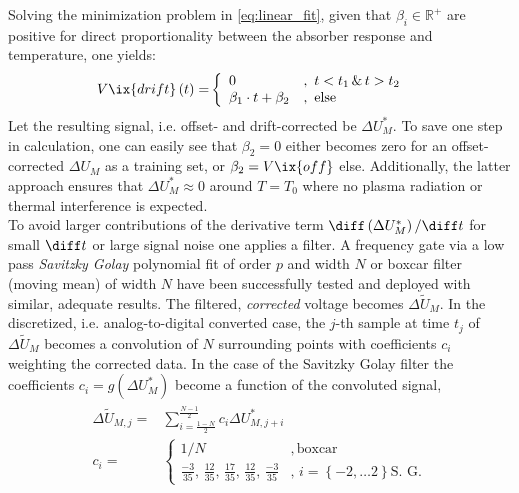%
                Solving the minimization problem in \cref{eq:linear_fit}, given that $\beta_{i}\in\mathbb{R}^{+}$ are positive for direct proportionality between the absorber response and temperature, one yields:%
%
                \begin{align}%
                    V\ix{drift}\left(t\right)=&\left\{%
                    \begin{array}{ll}%
                        0&,\,\,t<t_{1}\,\&\,t>t_{2}\\%
                        \beta_{1}\cdot t+\beta_{2}&,\,\,\text{else}%
                    \end{array}\right.\label{eq:drift}%
                \end{align}%
%
                Let the resulting signal, i.e. offset- and drift-corrected be $\Delta U^{*}_{M}$. To save one step in calculation, one can easily see that $\beta_{2}=0$ either becomes zero for an offset-corrected $\Delta U_{M}$ as a training set, or $\beta_{2}=V\ix{off}$ else. Additionally, the latter approach ensures that $\Delta U^{*}_{M}\approx0$ around $T=T_{0}$ where no plasma radiation or thermal interference is expected.\\%
                To avoid larger contributions of the derivative term $\diff\left(\Delta U^{*}_{M}\right)/\diff t$ for small $\diff t$ or large signal noise one applies a filter. A frequency gate via a low pass \textit{Savitzky Golay} polynomial fit of order $p$ and width $N$ or boxcar filter (moving mean) of width $N$ have been successfully tested and deployed with similar, adequate results. The filtered, \textit{corrected} voltage becomes $\Delta\widetilde{U}_{M}$. In the discretized, i.e. analog-to-digital converted  case, the $j$-th sample at time $t_{j}$ of $\Delta\widetilde{U}_{M}$ becomes a convolution of $N$ surrounding points with coefficients $c_{i}$ weighting the corrected data. In the case of the Savitzky Golay filter the coefficients $c_{i}=g\left(\Delta U_{M}^{*}\right)$ become a function of the convoluted signal, %
%
                \begin{align}%
                    \begin{split}%
                        \Delta\widetilde{U}_{M,j}=&\sum_{i=\frac{1-N}{2}}^{\frac{N-1}{2}}c_{i}\Delta U^{*}_{M, j+i}\\%
                        c_{i}=&\left\{\begin{array}{ll}%
                            1/N&,\,\text{boxcar}\\%
                            \frac{-3}{35},\,\frac{12}{35},\,\frac{17}{35},\,\frac{12}{35},\,\frac{-3}{35}&,\,i=\left\{-2,\dots2\right\}\text{S. G.}%
                        \end{array}\right.%
                    \end{split}\label{eq:averaging}%
                \end{align}%
